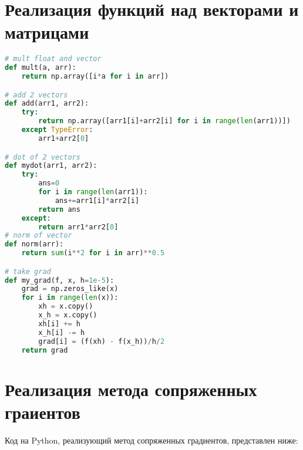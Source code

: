 \documentclass{article}
\begin{document}
\newpage
\section{Реализация функций над векторами и матрицами}
\begin{lstlisting}[language=Python]
# mult float and vector
def mult(a, arr):
    return np.array([i*a for i in arr])

# add 2 vectors
def add(arr1, arr2):
    try:
        return np.array([arr1[i]+arr2[i] for i in range(len(arr1))])
    except TypeError:
        arr1+arr2[0]

# dot of 2 vectors
def mydot(arr1, arr2):
    try:
        ans=0
        for i in range(len(arr1)):
            ans+=arr1[i]*arr2[i]
        return ans
    except:
        return arr1*arr2[0]
# norm of vector
def norm(arr):
    return sum(i**2 for i in arr)**0.5

# take grad
def my_grad(f, x, h=1e-5):
    grad = np.zeros_like(x)
    for i in range(len(x)):
        xh = x.copy()
        x_h = x.copy()
        xh[i] += h
        x_h[i] -= h
        grad[i] = (f(xh) - f(x_h))/h/2
    return grad
\end{lstlisting}


\newpage
\section{Реализация метода сопряженных граиентов}
Код на Python, реализующий метод сопряженных градиентов, представлен ниже:
\end{document}
